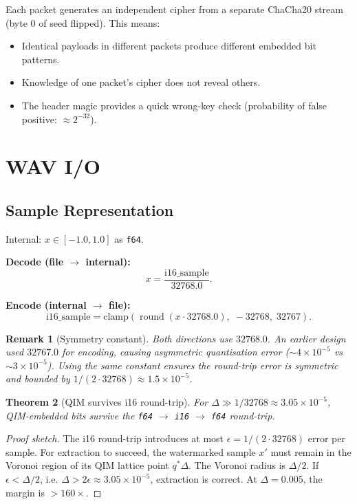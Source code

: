 \documentclass[11pt,a4paper]{article}
\newtheorem{theorem}{Theorem}[section]
\newtheorem{remark}[theorem]{Remark}
\DeclareMathOperator{\round}{round}
\begin{document}
Each packet generates an independent cipher from a separate ChaCha20 stream
(byte 0 of seed flipped).  This means:
\begin{itemize}
    \item Identical payloads in different packets produce different embedded
          bit patterns.
    \item Knowledge of one packet's cipher does not reveal others.
    \item The header magic provides a quick wrong-key check (probability of
          false positive: $\approx 2^{-32}$).
\end{itemize}


\section{WAV I/O}
\label{sec:wav}

\subsection{Sample Representation}

Internal: $x \in [-1.0, 1.0]$ as \texttt{f64}.

\textbf{Decode (file $\to$ internal):}
\[
    x = \frac{\text{i16\_sample}}{32768.0}.
\]

\textbf{Encode (internal $\to$ file):}
\[
    \text{i16\_sample} = \mathrm{clamp}\!\left(\round(x \cdot 32768.0),\; -32768,\; 32767\right).
\]

\begin{remark}[Symmetry constant]
Both directions use $32768.0$.  An earlier design used $32767.0$ for encoding,
causing asymmetric quantisation error ($\sim 4 \times 10^{-5}$ vs
$\sim 3 \times 10^{-5}$).  Using the same constant ensures the round-trip
error is symmetric and bounded by $1/(2 \cdot 32768) \approx 1.5 \times 10^{-5}$.
\end{remark}

\begin{theorem}[QIM survives i16 round-trip]
\label{thm:wav-roundtrip}
For $\Delta \gg 1/32768 \approx 3.05 \times 10^{-5}$, QIM-embedded bits
survive the \texttt{f64} $\to$ \texttt{i16} $\to$ \texttt{f64} round-trip.
\end{theorem}

\begin{proof}[Proof sketch]
The i16 round-trip introduces at most $\epsilon = 1/(2 \cdot 32768)$
error per sample.  For extraction to succeed, the watermarked sample
$x'$ must remain in the Voronoi region of its QIM lattice point $q^*\Delta$.
The Voronoi radius is $\Delta/2$.  If $\epsilon < \Delta/2$, i.e.
$\Delta > 2\epsilon \approx 3.05 \times 10^{-5}$, extraction is correct.
At $\Delta = 0.005$, the margin is $> 160\times$.
\end{proof}
\end{document}
